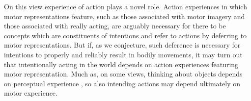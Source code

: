 \documentclass[12pt,\papersize]{extarticle}
\begin{document}
On this view experience of action plays a novel role. Action experiences in which motor representations feature, such as those associated with motor imagery and those associated with really acting, are arguably necessary for there to be concepts which are constituents of intentions and refer to actions by deferring to motor representations. But if, as we conjecture, such deference is necessary for intentions to properly and reliably result in bodily movements, it may turn out that intentionally acting in the world depends on action experiences featuring motor representation. Much as, on some views, thinking about objects depends on perceptual experience \citep[e.g.][]{Campbell:2002ge}, so also intending actions may depend ultimately on motor experience.  







\end{document}
